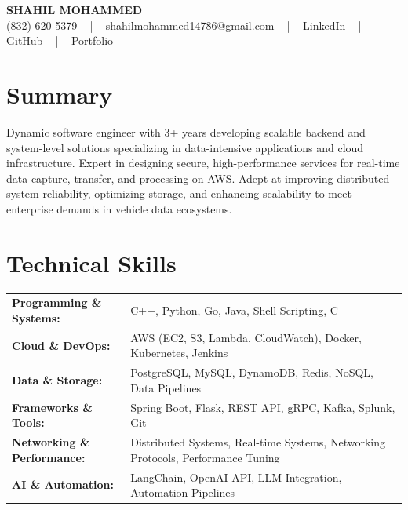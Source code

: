 \documentclass[letterpaper,11pt]{article}
\begin{document}
\begin{center}
    {\fontsize{14pt}{12pt}\selectfont \textbf{\MakeUppercase{Shahil Mohammed}}}\\ \vspace{2pt}
    \fontsize{10pt}{12pt}\selectfont (832) 620-5379 ~ | ~ \href{mailto:shahilmohammed14786@gmail.com}{shahilmohammed14786@gmail.com} ~ | ~  
    \href{https://www.linkedin.com/in/shahil-mohammed-9652931a1/}{\color{blue}\underline{LinkedIn}}  ~ | ~ 
    \href{https://github.com/freakbeast14}{\color{blue}\underline{GitHub}} ~ | ~ 
    \href{https://shahil-mohammed.netlify.app/}{\color{blue}\underline{Portfolio}}
    \vspace{-8pt}
\end{center}

\section{Summary}
\fontsize{9pt}{10pt}\selectfont
Dynamic software engineer with 3+ years developing scalable backend and system-level solutions specializing in data-intensive applications and cloud infrastructure. Expert in designing secure, high-performance services for real-time data capture, transfer, and processing on AWS. Adept at improving distributed system reliability, optimizing storage, and enhancing scalability to meet enterprise demands in vehicle data ecosystems.
 \vspace{-5pt}
 
\section{Technical Skills}
        \vspace{-14pt}
        \begin{table}[h]
            \fontsize{9pt}{10pt}\selectfont
            \begin{tabular}{p{0.3\linewidth} p{0.7\linewidth}}
                \textbf{Programming \& Systems:} & C++, Python, Go, Java, Shell Scripting, C \\
                \textbf{Cloud \& DevOps:} & AWS (EC2, S3, Lambda, CloudWatch), Docker, Kubernetes, Jenkins \\
                \textbf{Data \& Storage:} & PostgreSQL, MySQL, DynamoDB, Redis, NoSQL, Data Pipelines \\
                \textbf{Frameworks \& Tools:} & Spring Boot, Flask, REST API, gRPC, Kafka, Splunk, Git \\
                \textbf{Networking \& Performance:} & Distributed Systems, Real-time Systems, Networking Protocols, Performance Tuning \\
                \textbf{AI \& Automation:} & LangChain, OpenAI API, LLM Integration, Automation Pipelines \\
            \end{tabular}
        \end{table}
 \vspace{-15pt}
 
\end{document}
